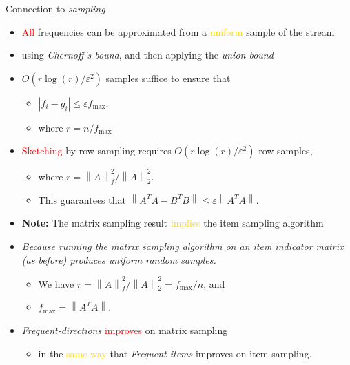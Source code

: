 \documentclass[first=dgreen,second=purple,logo=redque]{aaltoslides}
\newcommand{\vectornorm}[1]{\left\|#1\right\|}
\begin{document}
\begin{frame}[allowframebreaks=1]{Connection to \textit{sampling}}

\begin{itemize}
   \item \textcolor{red}{All} frequencies can be approximated from a
   \textcolor{gold}{uniform} sample of the stream
   \item using \textit{Chernoff's bound}, and then applying the \textit{union
   bound}
   \item $O(r\log{(r)}/\varepsilon^{2})$ samples suffice to ensure that
   \begin{itemize}
     \item $|f_{i} - g_{i}| \leq \varepsilon f_{\text{max}}$,
     \item where $r = n / f_{\text{max}}$
   \end{itemize}
\end{itemize}

\framebreak

\begin{itemize}
   \item \textcolor{red}{Sketching} by row sampling requires
   $O(r\log{(r)}/\varepsilon^{2})$ row samples,
   \begin{itemize}
     \item where $r = \vectornorm{A}_{f}^{2} /
   \vectornorm{A}_{2}^{2}$.
   	 \item This guarantees that $\vectornorm{A^{T}A - B^{T}B} \leq \varepsilon
   \vectornorm{A^{T}A}$.
   \end{itemize}
   \item \textbf{Note:} The matrix sampling result \textcolor{gold}{implies} the
   item sampling algorithm
   \item \emph{Because running the matrix sampling algorithm on an item
   indicator matrix (as before) produces uniform random samples.}
   \begin{itemize}
   \item We have $r = \vectornorm{A}_{f}^{2} / \vectornorm{A}_{2}^{2} =
   f_{\text{max}} / n$, and
   \item $f_{\text{max}} = \vectornorm{A^{T}A}$.\end{itemize}
   \item \textit{Frequent-directions} \textcolor{red}{improves} on matrix
   sampling
   \begin{itemize} \item in the \textcolor{gold}{same way} that
   \textit{Frequent-items} improves on item sampling.\end{itemize}
\end{itemize}

\end{frame}
\end{document}
